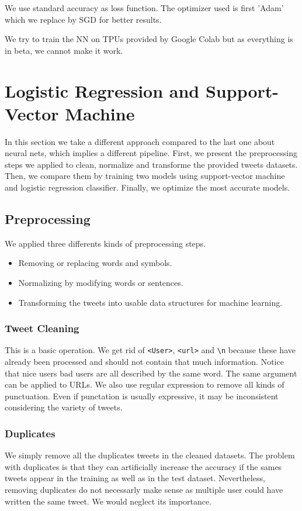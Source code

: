 \documentclass[11pt, a4paper, twocolumn]{article}
\begin{document}
We use standard accuracy as loss function. The optimizer used is first 'Adam' which we replace by SGD for better results.

We try to train the NN on TPUs provided by Google Colab but as everything is in beta, we cannot make it work.

\section{Logistic Regression and Support-Vector Machine}
In this section we take a different approach compared to the last one about neural nets, which implies a different pipeline. First, we present the preprocessing steps we applied to clean, normalize and transforme the provided tweets datasets. Then, we compare them by training two models using support-vector machine and logistic regression classifier. Finally, we optimize the most accurate models.

\subsection{Preprocessing}
We applied three differents kinds of preprocessing steps.
\begin{itemize}
	\item Removing or replacing words and symbols.
	\item Normalizing by modifying words or sentences.
	\item Transforming the tweets into usable data structures for machine learning.
\end{itemize}

\subsubsection{Tweet Cleaning}
This is a basic operation. We get rid of \texttt{<User>}, \texttt{<url>} and \verb"\n" because these have already been processed and should not contain that much information. Notice that nice users bad users are all described by the same word. The same argument can be applied to URLs. We also use regular expression to remove all kinds of punctuation. Even if punctation is usually expressive, it may be inconsistent considering the variety of tweets.
\subsubsection{Duplicates}
We simply remove all the duplicates tweets in the cleaned datasets. The problem with duplicates is that they can artificially increase the accuracy if the sames tweets appear in the training as well as in the test dataset. Nevertheless, removing duplicates do not necessarly make sense as multiple user could have written the same tweet. We would neglect its importance.
\end{document}

